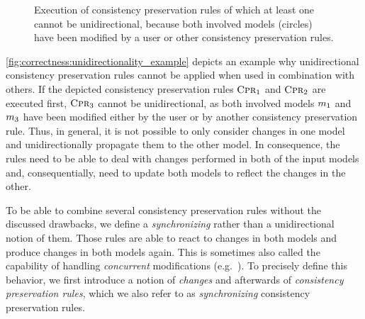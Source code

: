 \begin{figure}
    \centering
    
    \caption[Unidirectional consistency preservation in networks]{Execution of consistency preservation rules of which at least one cannot be unidirectional, because both involved models (circles) have been modified by a user or other consistency preservation rules.}
    \label{fig:correctness:unidirectionality_example}
\end{figure}

\autoref{fig:correctness:unidirectionality_example} depicts an example why unidirectional consistency preservation rules cannot be applied when used in combination with others.
If the depicted consistency preservation rules $\textsc{Cpr}_{1}$ and $\textsc{Cpr}_{2}$ are executed first, $\textsc{Cpr}_{3}$ cannot be unidirectional, as both involved models $\model{m}{1}$ and $\model{m}{3}$ have been modified either by the user or by another consistency preservation rule.
Thus, in general, it is not possible to only consider changes in one model and unidirectionally propagate them to the other model.
In consequence, the rules need to be able to deal with changes performed in both of the input models and, consequentially, need to update both models to reflect the changes in the other.

To be able to combine several consistency preservation rules without the discussed drawbacks, we define a \emph{synchronizing} rather than a unidirectional notion of them.
Those rules are able to react to changes in both models and produce changes in both models again.
This is sometimes also called the capability of handling \emph{concurrent} modifications (e.g.~\cite{leblebici2014IncrementalTGGSurvey-GTVMT}).
To precisely define this behavior, we first introduce a notion of \emph{changes} and afterwards of \emph{consistency preservation rules}, which we also refer to as \emph{synchronizing} consistency preservation rules.

